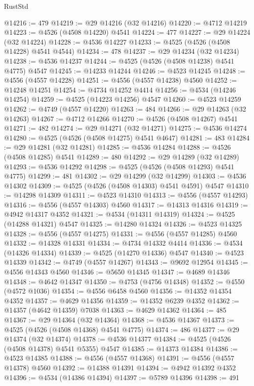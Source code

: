 \begin{lexlean}{RustStd}
\begin{coremodule}
@14216 := 479
@14219 := @29 @14216 (@32 @14216)
@14220 := @4712 @14219
@14223 := @4526 (@4508 @14220) @4541
@14224 := 477
@14227 := @29 @14224 (@32 @14224)
@14228 := @4536 @14227
@14233 := @4525 (@4526 (@4508 @14228) @4541 @4544)
@14234 := 478
@14237 := @29 @14234 (@32 @14234)
@14238 := @4536 @14237
@14244 := @4525 (@4526 (@4508 @14238) @4541 @4775) @4547
@14245 := @14233 @14244
@14246 := @4523 @14245
@14248 := @4556 (@4557 @14228)
@14251 := @4556 (@4557 @14238) @4560
@14252 := @14248 @14251
@14254 := @4734 @14252 @4414
@14256 := @4534 (@14246 @14254)
@14259 := @4525 (@14223 @14256) @4547
@14260 := @4523 @14259
@14262 := @4749 (@4557 @14220)
@14263 := 484
@14266 := @29 @14263 (@32 @14263)
@14267 := @4712 @14266
@14270 := @4526 (@4508 @14267) @4541
@14271 := 482
@14274 := @29 @14271 (@32 @14271)
@14275 := @4536 @14274
@14280 := @4525 (@4526 (@4508 @14275) @4541 @4647)
@14281 := 483
@14284 := @29 @14281 (@32 @14281)
@14285 := @4536 @14284
@14288 := @4526 (@4508 @14285) @4541
@14289 := 480
@14292 := @29 @14289 (@32 @14289)
@14293 := @4536 @14292
@14298 := @4525 (@4526 (@4508 @14293) @4541 @4775)
@14299 := 481
@14302 := @29 @14299 (@32 @14299)
@14303 := @4536 @14302
@14309 := @4525 (@4526 (@4508 @14303) @4541 @4591) @4547
@14310 := @14298 @14309
@14311 := @4523 @14310
@14313 := @4556 (@4557 @14293)
@14316 := @4556 (@4557 @14303) @4560
@14317 := @14313 @14316
@14319 := @4942 @14317 @4352
@14321 := @4534 (@14311 @14319)
@14324 := @4525 (@14288 @14321) @4547
@14325 := @14280 @14324
@14326 := @4523 @14325
@14328 := @4556 (@4557 @14275)
@14331 := @4556 (@4557 @14285) @4560
@14332 := @14328 @14331
@14334 := @4734 @14332 @4414
@14336 := @4534 (@14326 @14334)
@14339 := @4525 (@14270 @14336) @4547
@14340 := @4523 @14339
@14342 := @4749 (@4557 @14267)
@14343 := @9692 @12954
@14345 := @4556 @14343 @4560
@14346 := @5650 @14345
@14347 := @4689 @14346
@14348 := @4642 @14347
@14350 := @4753 (@4756 @14348)
@14352 := @4550 (@4572 @1036)
@14354 := @4556 @6458 @4560
@14356 := @14352 @14354 @4352
@14357 := @4629 @14356
@14359 := @14352 @6239 @4352
@14362 := @14357 (@4642 @14359) @7038
@14363 := @4629 @14362
@14364 := 485
@14367 := @29 @14364 (@32 @14364)
@14368 := @4536 @14367
@14373 := @4525 (@4526 (@4508 @14368) @4541 @4775)
@14374 := 486
@14377 := @29 @14374 (@32 @14374)
@14378 := @4536 @14377
@14384 := @4525 (@4526 (@4508 @14378) @4541 @5355) @4547
@14385 := @14373 @14384
@14386 := @4523 @14385
@14388 := @4556 (@4557 @14368)
@14391 := @4556 (@4557 @14378) @4560
@14392 := @14388 @14391
@14394 := @4942 @14392 @4352
@14396 := @4534 (@14386 @14394)
@14397 := @5789 @14396
@14398 := 491

\end{coremodule}
\end{lexlean}
